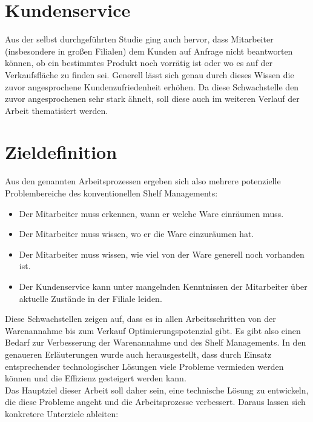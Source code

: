 \section{Kundenservice}
Aus der selbst durchgeführten Studie ging auch hervor, dass Mitarbeiter (insbesondere in großen Filialen) dem Kunden auf Anfrage nicht beantworten können, ob ein bestimmtes Produkt noch vorrätig ist oder wo es auf der Verkaufsfläche zu finden sei. Generell lässt sich genau durch dieses Wissen die zuvor angesprochene Kundenzufriedenheit erhöhen. Da diese Schwachstelle den zuvor angesprochenen sehr stark ähnelt, soll diese auch im weiteren Verlauf der Arbeit thematisiert werden. 

\section{Zieldefinition}
\label{sec:zieldefinition}
Aus den genannten Arbeitsprozessen ergeben sich also mehrere potenzielle Problembereiche des konventionellen Shelf Managements:

\begin{itemize}
	\item Der Mitarbeiter muss erkennen, wann er welche Ware einräumen muss.
	\item Der Mitarbeiter muss wissen, wo er die Ware einzuräumen hat.
	\item Der Mitarbeiter muss wissen, wie viel von der Ware generell noch vorhanden ist.
	\item Der Kundenservice kann unter mangelnden Kenntnissen der Mitarbeiter über aktuelle Zustände in der Filiale leiden.
\end{itemize}

Diese Schwachstellen zeigen auf, dass es in allen Arbeitsschritten von der Warenannahme bis zum Verkauf Optimierungspotenzial gibt. Es gibt also einen Bedarf zur Verbesserung der Warenannahme und des Shelf Managements. In den genaueren Erläuterungen wurde auch herausgestellt, dass durch Einsatz entsprechender technologischer Lösungen viele Probleme vermieden werden können und die Effizienz gesteigert werden kann.\\
Das Hauptziel dieser Arbeit soll daher sein, eine technische Lösung zu entwickeln, die diese Probleme angeht und die Arbeitsprozesse verbessert. Daraus lassen sich konkretere Unterziele ableiten:

